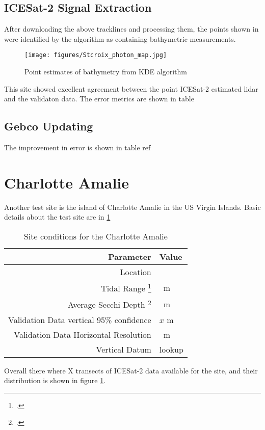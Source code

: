 \subsection{ICESat-2 Signal Extraction}
After downloading the above tracklines and processing them, the points shown in were identified by the algorithm as containing bathymetric measurements.

\begin{figure}[h!]
    \centering
    \texttt{[image: figures/Stcroix\_photon\_map.jpg]}
    \caption{Point estimates of bathymetry from KDE algorithm }
    \label{fig:stcroix-bathy-points}
\end{figure}

This site showed excellent agreement between the point ICESat-2 estimated lidar and the validaton data. The error metrics are shown in table



\subsection{Gebco Updating}

The improvement in error is shown in table ref{}



\section{Charlotte Amalie}
Another test site is the island of Charlotte Amalie in the US Virgin Islands. Basic details about the test site are in \ref{table:charlotteamalie_datatable}
\begin{table}[h!]
    \begin{minipage}{0.5\textwidth}
        \centering\begin{tabular}{r l }
            Parameter                                                 & \textbf{Value} \\
            \hline
            Location                                                  &                \\
            Tidal Range \footcite{tidal_data_reanalysis2022}          & \qty{}{m}      \\
            Average Secchi Depth \footcite{ACRI-STGlobColourTeam2020} & \qty{}{m}      \\
            Validation Data vertical 95\% confidence                  & $x$ m          \\
            Validation Data Horizontal Resolution                     & \qty{}{m}      \\
            Vertical Datum                                            & lookup         \\
        \end{tabular}
    \end{minipage}
    \caption{Site conditions for the Charlotte Amalie}
    \label{table:charlotteamalie_datatable}
\end{table}
Overall there where X  transects of ICESat-2 data available for the site, and their distribution is shown in figure \ref{}.

